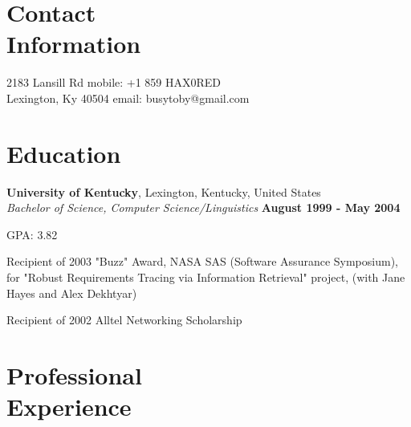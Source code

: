 \documentclass[margin,line]{resume}
\begin{document}
\begin{resume}

    \section{\mysidestyle Contact\\Information}

    2183 Lansill Rd                         \hfill mobile: +1 859 HAX0RED\\
    Lexington, Ky 40504                     \hfill email: busytoby@gmail.com\vspace{-6mm}\\%

    \section{\mysidestyle Education}

    \textbf{University of Kentucky}, Lexington, Kentucky, United States \\
    \textsl{Bachelor of Science, Computer Science/Linguistics} \hfill \textbf{ August 1999 - May 2004}\vspace{-4mm}\\%
    \begin{list2}
        \item GPA: 3.82
        \item Recipient of 2003 "Buzz" Award, NASA SAS (Software Assurance Symposium), for "Robust Requirements 
              Tracing via Information Retrieval" project, (with Jane Hayes and Alex Dekhtyar)
        \item Recipient of 2002 Alltel Networking Scholarship
    \end{list2}\vspace{-2.5mm}


    \section{\mysidestyle Professional\\Experience}


\end{resume}
\end{document}
